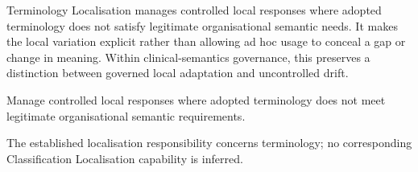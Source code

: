 Terminology Localisation manages controlled local responses where adopted terminology does not satisfy legitimate organisational semantic needs. It makes the local variation explicit rather than allowing ad hoc usage to conceal a gap or change in meaning. Within clinical-semantics governance, this preserves a distinction between governed local adaptation and uncontrolled drift.



Manage controlled local responses where adopted terminology does not meet legitimate organisational semantic requirements.



The established localisation responsibility concerns terminology; no corresponding Classification Localisation capability is inferred.


